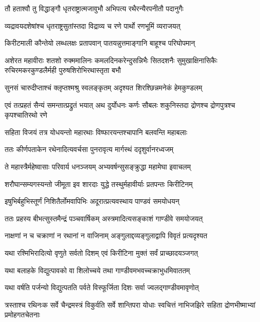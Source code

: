\twolineshloka
{तौ हताश्वौ तु विद्धाङ्गौ धृतराष्ट्रात्मजावुभौ}
{अभिपत्य रथैरन्यैरपनीतौ पदानुगैः}


\twolineshloka
{व्यद्रावयदशेषांश्च धृतराष्ट्रसुतांस्तदा}
{विद्राव्य च रणे पार्थो रणभूमिं व्यराजयत्}


\twolineshloka
{किरीटमाली कौन्तेयो लब्धलक्षः प्रतापवान्}
{पातयन्नुत्तमाङ्गानि बाहूश्च परिघोपमान्}


\onelineshloka
{अशेरत महावीराः शतशो रुक्ममालिनः}
\twolineshloka
{कमलदिनकरेन्दुसन्निभैः सितदशनैः सुमुखाक्षिनासिकैः}
{रुचिरमकरकुण्डलैर्मही पुरुषशिरोभिरथास्तृता बभौ}


\twolineshloka
{सुनसं चारुदीप्ताश्चं क्लृप्तश्मश्रु स्वलङ्कृतम्}
{अदृश्यत शिरश्छिन्नमनेकं हेमकुण्डलम्}


\onelineshloka
{एवं तत्प्रहतं सैन्यं समन्तात्प्रद्रुतं भयात्}
\twolineshloka
{अथ दुर्योधनः कर्णः सौबलः शकुनिस्तदा}
{द्रोणश्च द्रोणपुत्रश्च कृपश्चातिरथो रणे}


\twolineshloka
{सहिता विजयं तत्र योधयन्तो महारथाः}
{विष्फारयन्तश्चापानि बलवन्ति महाबलाः}


\twolineshloka
{ततः कीर्णपताकेन रथेनादित्यवर्चसा}
{पुनरावृत्य मार्गस्थं ददृशुर्वानरध्वजम्}


\twolineshloka
{ते महास्त्रैर्महेष्वासाः परिवार्य धनञ्जयम्}
{अभ्यवर्षन्सुसङ्क्रुद्धा महामेघा इवाचलम्}


\twolineshloka
{शरौघान्सम्यगस्यन्तो जीमूता इव शारदाः}
{युद्धे तस्थुर्महावीर्याः प्रतपन्तः किरीटिनम्}


\twolineshloka
{इषुभिर्बहुभिस्तूर्णं निशितैर्लोमवापिभिः}
{अदूरात्प्रत्यवस्थाय पाण्डवं समयोधयन्}


\twolineshloka
{ततः प्रहस्य बीभत्सुस्तमैन्द्रं पञ्चवार्षिकम्}
{अस्त्रमादित्यसङ्काशं गाण्डीवे समयोजयत्}


\twolineshloka
{नाक्षणां न च चक्राणां न रथानां न वाजिनाम्}
{अङ्गुलाद्दव्यङ्गुलाद्वापि विवृतं प्रत्यदृश्यत}


\twolineshloka
{यथा रश्मिभिरादित्यो वृणुते सर्वतो दिशम्}
{एवं किरीटिना मुक्तं सर्वं प्राच्छादयञ्जगत्}


\twolineshloka
{यथा बलाहके विद्युत्पावको वा शिलोच्चये}
{तथा गाण्डीवमभवच्चक्राभुधमिवाततम्}


\twolineshloka
{यथा वर्षति पर्जन्यो विद्युत्पतति पर्वते}
{विस्फूर्जिता दिशः सर्वा ज्वलद्गाण्डीवमावृणोत्}


\threelineshloka
{त्रस्ताश्च रथिनःक सर्वे चैन्द्रमस्त्रं विकुर्वति}
{सर्वे शान्तिपरा योधाः स्वचित्तं नाभिजझिरे}
{सहिता द्रोणभीष्माभ्यां प्रमोहगतचेतनाः}


